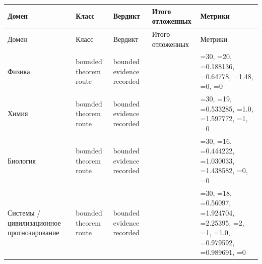 \begin{longtable}{@{}L{0.17\textwidth}L{0.11\textwidth}L{0.11\textwidth}L{0.09\textwidth}L{0.36\textwidth}@{}}
\toprule
Домен & Класс & Вердикт & Итого отложенных & Метрики \\
\midrule
\endfirsthead
\toprule
Домен & Класс & Вердикт & Итого отложенных & Метрики \\
\midrule
\endhead
Физика & bounded theorem route & bounded evidence recorded &  & =30, \allowbreak {}=20, \allowbreak {}=0.188136, \allowbreak {}=0.64778, \allowbreak {}=1.48, \allowbreak {}=0, \allowbreak {}=0 \\
Химия & bounded theorem route & bounded evidence recorded &  & =30, \allowbreak {}=19, \allowbreak {}=0.533285, \allowbreak {}=1.0, \allowbreak {}=1.597772, \allowbreak {}=1, \allowbreak {}=0 \\
Биология & bounded theorem route & bounded evidence recorded &  & =30, \allowbreak {}=16, \allowbreak {}=0.444222, \allowbreak {}=1.030033, \allowbreak {}=1.438582, \allowbreak {}=0, \allowbreak {}=0 \\
Системы / цивилизационное прогнозирование & bounded theorem route & bounded evidence recorded &  & =30, \allowbreak {}=18, \allowbreak {}=0.56097, \allowbreak {}=1.924704, \allowbreak {}=2.25395, \allowbreak {}=2, \allowbreak {}=1, \allowbreak {}=1.0, \allowbreak {}=0.979592, \allowbreak {}=0.989691, \allowbreak {}=0 \\
\bottomrule
\end{longtable}
